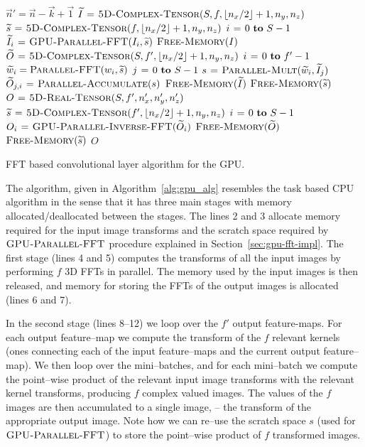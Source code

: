 \documentclass[conference]{./IEEEtran/IEEEtran}
\DeclarePairedDelimiter{\floor}{\lfloor}{\rfloor}
\begin{document}
  \begin{algorithm}
    {\footnotesize
    \begin{codebox}
      \li $\vec{n}' = \vec{n} - \vec{k} + \vec{1}$
      \li $\widetilde{I} \gets \proc{5D-Complex-Tensor}(S,f,\floor{n_x/2}+1,n_y,n_z)$
      \li $\widetilde{s} \gets \proc{5D-Complex-Tensor}(f,\floor{n_x/2}+1,n_y,n_z)$
      \li \For $i \gets 0 \To S-1$
      \li   \Do $\widetilde{I}_{i} \mathrel{\hspace{1pt}=\hspace{1pt}} \textnormal{\scshape GPU-Parallel-FFT}(I_{i},\widetilde{s})$
      \End
      \li $\textnormal{\scshape Free-Memory}(I)$
      \li $\widetilde{O} \gets \proc{5D-Complex-Tensor}(S,f',\floor{n_x/2}+1,n_y,n_z)$
      \li \For $i \gets 0 \To f'-1$
      \li    \Do $\widetilde{w}_{i} = \textnormal{\scshape Parallel-FFT}(w_{i},\widetilde{s})$
      \li        \For $j \gets 0 \To S-1$
      \li           \Do $s \mathrel{\hspace{1pt}=\hspace{1pt}} \textnormal{\scshape Parallel-Mult}(\widetilde{w}_{i}, \widetilde{I}_{j})$
      \li               $\widetilde{O}_{j,i} \mathrel{\hspace{1pt}=\hspace{1pt}} \textnormal{\scshape Parallel-Accumulate}(s)$
      \End \End
      \li $\textnormal{\scshape Free-Memory}(\widetilde{I})$
      \li $\textnormal{\scshape Free-Memory}(\widetilde{s})$
      \li $O \mathrel{\hspace{1pt}=\hspace{1pt}} \textnormal{\scshape5D-Real-Tensor}(S,f',n'_x,n'_y,n'_z)$
      \li $\widetilde{s} \gets \proc{5D-Complex-Tensor}(f',\floor{n_x/2}+1,n_y,n_z)$
      \li \For $i \gets 0 \To S-1$
      \li   \Do $O_{i} \mathrel{\hspace{1pt}=\hspace{1pt}} \textnormal{\scshape GPU-Parallel-Inverse-FFT}(\widetilde{O}_{i})$
      \End
      \li $\textnormal{\scshape Free-Memory}(\widetilde{O})$
      \li $\textnormal{\scshape Free-Memory}(\widetilde{s})$
      \li \Return $O$
    \end{codebox}
    }

    \caption{FFT based convolutional layer algorithm for the GPU.}
    \label{alg:gpu_alg}
  \end{algorithm}

  The algorithm, given in Algorithm~\ref{alg:gpu_alg} resembles the
  task based CPU algorithm in the sense that it has three main stages
  with memory allocated/deallocated between the stages.  The lines 2
  and 3 allocate memory required for the input image transforms and
  the scratch space required by $\textnormal{\scshape GPU-Parallel-FFT}$ procedure
  explained in Section~\ref{sec:gpu-fft-impl}.  The first stage (lines
  4 and 5) computes the transforms of all the input images by
  performing $f$ 3D FFTs in parallel.  The memory used by the input
  images is then released, and memory for storing the FFTs of the
  output images is allocated (lines 6 and 7).

  In the second stage (lines 8--12) we loop over the $f'$ output
  feature-maps.  For each output feature--map we compute the transform
  of the $f$ relevant kernels (ones connecting each of the input
  feature--maps and the current output feature--map).  We then loop
  over the mini--batches, and for each mini--batch we compute the
  point--wise product of the relevant input image transforms with the
  relevant kernel transforms, producing $f$ complex valued images.
  The values of the $f$ images are then accumulated to a single image,
  -- the transform of the appropriate output image.  Note how we can
  re--use the scratch space $s$ (used for $\textnormal{\scshape GPU-Parallel-FFT}$)
  to store the point--wise product of $f$ transformed images.
\end{document}
